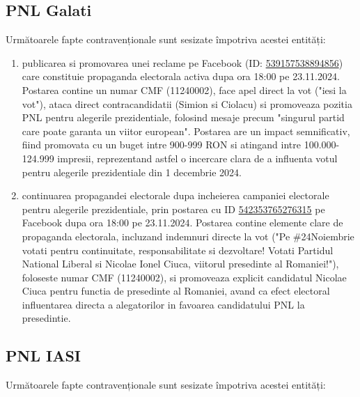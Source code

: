 \documentclass[a4paper,12pt]{article}
\begin{document}
\vspace{0.5cm}

\subsection{PNL Galati}
Următoarele fapte contravenționale sunt sesizate împotriva acestei entități:

\begin{enumerate}[leftmargin=*, label=\arabic*.)]
    \item publicarea si promovarea unei reclame pe Facebook (ID: \href{https://www.facebook.com/ads/library/?id=539157538894856}{539157538894856}) care constituie propaganda electorala activa dupa ora 18:00 pe 23.11.2024. Postarea contine un numar CMF (11240002), face apel direct la vot ("iesi la vot"), ataca direct contracandidatii (Simion si Ciolacu) si promoveaza pozitia PNL pentru alegerile prezidentiale, folosind mesaje precum "singurul partid care poate garanta un viitor european". Postarea are un impact semnificativ, fiind promovata cu un buget intre 900-999 RON si atingand intre 100.000-124.999 impresii, reprezentand astfel o incercare clara de a influenta votul pentru alegerile prezidentiale din 1 decembrie 2024.
    \item continuarea propagandei electorale dupa incheierea campaniei electorale pentru alegerile prezidentiale, prin postarea cu ID \href{https://www.facebook.com/ads/library/?id=542353765276315}{542353765276315} pe Facebook dupa ora 18:00 pe 23.11.2024. Postarea contine elemente clare de propaganda electorala, incluzand indemnuri directe la vot ("Pe \#24Noiembrie votati pentru continuitate, responsabilitate si dezvoltare! Votati Partidul National Liberal si Nicolae Ionel Ciuca, viitorul presedinte al Romaniei!"), foloseste numar CMF (11240002), si promoveaza explicit candidatul Nicolae Ciuca pentru functia de presedinte al Romaniei, avand ca efect electoral influentarea directa a alegatorilor in favoarea candidatului PNL la presedintie.
\end{enumerate}

\vspace{0.5cm}

\subsection{PNL IASI}
Următoarele fapte contravenționale sunt sesizate împotriva acestei entități:
\end{document}
